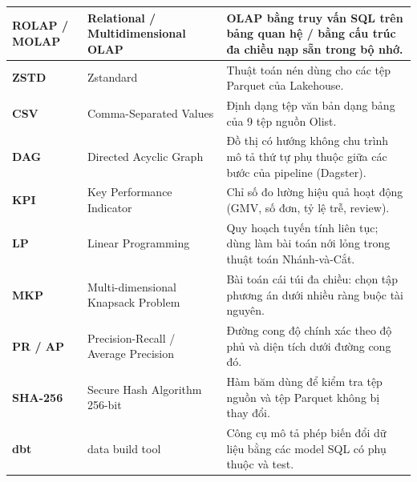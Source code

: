 \begin{xltabular}{\textwidth}{|>{\raggedright\arraybackslash}m{2.5cm}|>{\raggedright\arraybackslash}m{5cm}|L|}
\hline
\textbf{ROLAP / MOLAP} & Relational / Multidimensional OLAP & OLAP bằng truy vấn SQL trên bảng quan hệ / bằng cấu trúc đa chiều nạp sẵn trong bộ nhớ. \\
\hline
\textbf{ZSTD} & Zstandard & Thuật toán nén dùng cho các tệp Parquet của Lakehouse. \\
\hline
\textbf{CSV} & Comma-Separated Values & Định dạng tệp văn bản dạng bảng của 9 tệp nguồn Olist. \\
\hline
\textbf{DAG} & Directed Acyclic Graph & Đồ thị có hướng không chu trình mô tả thứ tự phụ thuộc giữa các bước của pipeline (Dagster). \\
\hline
\textbf{KPI} & Key Performance Indicator & Chỉ số đo lường hiệu quả hoạt động (GMV, số đơn, tỷ lệ trễ, review). \\
\hline
\textbf{LP} & Linear Programming & Quy hoạch tuyến tính liên tục; dùng làm bài toán nới lỏng trong thuật toán Nhánh-và-Cắt. \\
\hline
\textbf{MKP} & Multi-dimensional Knapsack Problem & Bài toán cái túi đa chiều: chọn tập phương án dưới nhiều ràng buộc tài nguyên. \\
\hline
\textbf{PR / AP} & Precision-Recall / Average Precision & Đường cong độ chính xác theo độ phủ và diện tích dưới đường cong đó. \\
\hline
\textbf{SHA-256} & Secure Hash Algorithm 256-bit & Hàm băm dùng để kiểm tra tệp nguồn và tệp Parquet không bị thay đổi. \\
\hline
\textbf{dbt} & data build tool & Công cụ mô tả phép biến đổi dữ liệu bằng các model SQL có phụ thuộc và test. \\
\hline
\end{xltabular}

\vspace{0.8cm}
